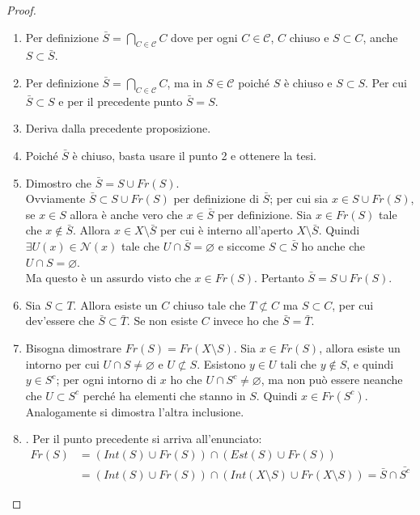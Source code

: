 \begin{proof} \
	\begin{enumerate} 
		\item Per definizione $\bar{S} = \bigcap_{C \in \mathcal{C}} C$ dove per ogni $C \in \mathcal{C}$, $C$ chiuso e $S \subset C$, anche $S \subset \bar{S}$.
		\item Per definizione $\bar{S} = \bigcap_{C \in \mathcal{C}} C$, ma in $S \in \mathcal{C}$ poiché $S$ è chiuso e $S \subset S$. Per cui $\bar{S} \subset S$ e per il precedente punto $\bar{S} = S$.
		\item Deriva dalla precedente proposizione.
		\item Poiché $\bar{S}$ è chiuso, basta usare il punto 2 e ottenere la tesi.
		\item Dimostro che $\bar{S}= S \cup Fr(S)$. \\ Ovviamente $\bar{S} \subset S \cup Fr(S)$ per definizione di $\bar{S}$; per cui sia $x \in S \cup Fr(S)$, se $x \in S$ allora è anche vero che $x \in \bar{S}$ per definizione. Sia $x \in Fr(S)$ tale che $x \notin \bar{S}$. Allora $x \in X \setminus \bar{S}$ per cui è interno all'aperto $X \setminus \bar{S}$. Quindi $\exists U(x) \in \mathcal{N}(x)$ tale che $U \cap \bar{S} = \varnothing$ e siccome $S \subset \bar{S}$ ho anche che $U \cap S = \varnothing$. \\ Ma questo è un assurdo visto che $x \in Fr(S)$. Pertanto $\bar{S} = S \cup Fr(S)$.
		\item Sia $S \subset T$. Allora esiste un $C$ chiuso tale che $T \not\subset C$ ma $S \subset C$, per cui dev'essere che $\bar{S} \subset \bar{T}$. Se non esiste $C$ invece ho che $\bar{S} = \bar{T}$.
		\item Bisogna dimostrare $Fr(S)= Fr(X \setminus S)$. Sia $x \in Fr(S)$, allora esiste un intorno per cui $U \cap S \neq \varnothing$ e $U \not\subset S$. Esistono $y\in U$ tali che $y \notin S$, e quindi $y \in S^c$; per ogni intorno di $x$ ho che $U \cap S^c \neq \varnothing$, ma non può essere neanche che $U \subset S^c$ perché ha elementi che stanno in $S$. Quindi $x \in Fr(S^c)$. Analogamente si dimostra l'altra inclusione.  
		\item . Per il punto precedente si arriva all'enunciato:
		\begin{align*}
			Fr(S) & = (Int(S) \cup Fr(S)) \cap (Est(S) \cup Fr(S)) \\
					& = (Int(S) \cup Fr(S)) \cap (Int(X \setminus S) \cup Fr(X \setminus S)) = \bar{S} \cap \bar{S^c} 
		\end{align*}
	\end{enumerate}
\end{proof}

